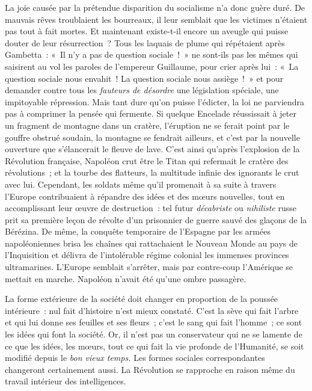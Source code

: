 \documentclass[french,twoside]{book} %
\begin{document}
La joie causée par la prétendue disparition du socialisme n’a donc guère duré. De mauvais rêves troublaient les bourreaux, il leur semblait que les victimes  n’étaient pas tout à fait mortes. Et maintenant existe-t-il encore un aveugle qui puisse douter de leur résurrection ? Tous les laquais de plume qui répétaient après Gambetta : « Il n’y a pas de question sociale ! » ne sont-ils pas les mêmes qui saisirent au vol les paroles de l’empereur Guillaume, pour crier après lui : « La question sociale nous envahit ! La question sociale nous assiège ! » et pour demander contre tous les \emph{fauteurs de désordre} une législation spéciale, une impitoyable répression. Mais tant dure qu’on puisse l’édicter, la loi ne parviendra pas à comprimer la pensée qui fermente. Si quelque Encelade réussissait à jeter un fragment de montagne dans un cratère, l’éruption ne se ferait point par le gouffre obstrué soudain, la  montagne se fendrait ailleurs, et c’est par la nouvelle ouverture que s’élancerait le fleuve de lave. C’est ainsi qu’après l’explosion de la Révolution française, Napoléon crut être le Titan qui refermait le cratère des révolutions ; et la tourbe des flatteurs, la multitude infinie des ignorants le crut avec lui. Cependant, les soldats même qu’il promenait à sa suite à travers l’Europe contribuaient à répandre des idées et des mœurs nouvelles, tout en accomplissant leur œuvre de destruction : tel futur \emph{décabriste} ou \emph{nihiliste} russe prit sa première leçon de révolte d’un prisonnier de guerre sauvé des glaçons de la Bérézina. De même, la conquête temporaire de l’Espagne par les armées napoléoniennes brisa les chaînes qui rattachaient  le Nouveau Monde au pays de l’Inquisition et délivra de l’intolérable régime colonial les immenses provinces ultramarines. L’Europe semblait s’arrêter, mais par contre-coup l’Amérique se mettait en marche. Napoléon n’avait été qu’une ombre passagère.\par
La forme extérieure de la société doit changer en proportion de la poussée intérieure : nul fait d’histoire n’est mieux constaté. C’est la sève qui fait l’arbre et qui lui donne ses feuilles et ses fleurs ; c’est le sang qui fait l’homme ; ce sont les idées qui font la société. Or, il n’est pas un conservateur qui ne se lamente de ce que les idées, les mœurs, tout ce qui fait la vie profonde de l’Humanité, se soit modifié depuis le \emph{bon vieux temps.} Les formes sociales correspondantes  changeront certainement aussi. La Révolution se rapproche en raison même du travail intérieur des intelligences.\par
\end{document}
